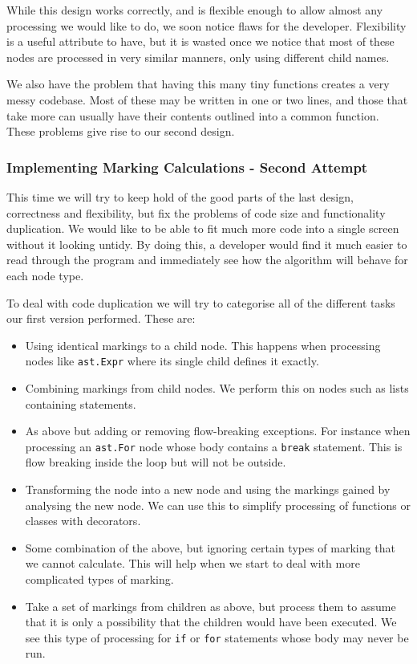 \documentclass[twoside,a4paper]{report}
\begin{document}
While this design works correctly, and is flexible enough to allow almost any processing we would like to do, we soon notice flaws for the developer.
Flexibility is a useful attribute to have, but it is wasted once we notice that most of these nodes are processed in very similar manners, only using
different child names.

We also have the problem that having this many tiny functions creates a very messy codebase. Most of these may be written in one or two lines, and those
that take more can usually have their contents outlined into a common function. These problems give rise to our second design.

\subsubsection{Implementing Marking Calculations - Second Attempt}

This time we will try to keep hold of the good parts of the last design, correctness and flexibility, but fix the problems of code size and functionality
duplication. We would like to be able to fit much more code into a single screen without it looking untidy. By doing this, a developer would find it much
easier to read through the program and immediately see how the algorithm will behave for each node type.

To deal with code duplication we will try to categorise all of the different tasks our first version performed. These are:

\begin{itemize}
\item Using identical markings to a child node. This happens when processing nodes like \texttt{ast.Expr} where its single child defines it exactly.
\item Combining markings from child nodes. We perform this on nodes such as lists containing statements.
\item As above but adding or removing flow-breaking exceptions. For instance when processing an \texttt{ast.For} node whose body contains a \texttt{break}
      statement. This is flow breaking inside the loop but will not be outside.
\item Transforming the node into a new node and using the markings gained by analysing the new node. We can use this to simplify processing of functions
      or classes with decorators.
\item Some combination of the above, but ignoring certain types of marking that we cannot calculate. This will help when we start to deal with more complicated
      types of marking.
\item Take a set of markings from children as above, but process them to assume that it is only a possibility that the children would have been executed. We 
      see this type of processing for \texttt{if} or \texttt{for} statements whose body may never be run.
\end{itemize}
\end{document}
